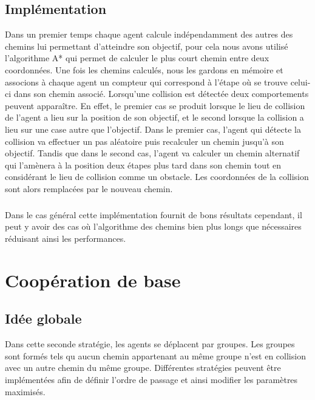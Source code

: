 \documentclass[a4paper, twocolumn]{article}
\begin{document}
			\subsection{Implémentation}
			Dans un premier temps chaque agent calcule indépendamment des autres des chemins lui permettant d'atteindre son objectif, pour cela nous avons utilisé l'algorithme A* qui permet de calculer le plus court chemin entre deux coordonnées.
			Une fois les chemins calculés, nous les gardons en mémoire et associons à chaque agent un compteur qui correspond à l'étape où se trouve celui-ci dans son chemin associé.
			Lorsqu'une collision est détectée deux comportements peuvent apparaître.
			En effet, le premier cas se produit lorsque le lieu de collision de l'agent a lieu sur la position de son objectif, et le second lorsque la collision a lieu sur une case autre que l'objectif.
			Dans le premier cas, l'agent qui détecte la collision va effectuer un pas aléatoire puis recalculer un chemin jusqu'à son objectif. Tandis que dans le second cas, l'agent va calculer un chemin alternatif qui l'amènera à la position deux étapes plus tard dans son chemin tout en considérant le lieu de collision comme un obstacle. Les coordonnées de la collision sont alors remplacées par le nouveau chemin.
			
			\subparagraph{}
			Dans le cas général cette implémentation fournit de bons résultats cependant, il peut y avoir des cas où l'algorithme des chemins bien plus longs que nécessaires réduisant ainsi les performances.

		\section{Coopération de base}

			\subsection{Idée globale}
			Dans cette seconde stratégie, les agents se déplacent par groupes. Les groupes sont formés tels qu aucun chemin appartenant au même groupe n'est en collision avec un autre chemin du même groupe. Différentes stratégies peuvent être implémentées afin de définir l'ordre de passage et ainsi modifier les paramètres maximisés.
\end{document}
